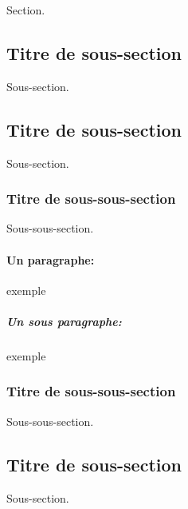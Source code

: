     Section.
        
    \subsection{Titre de sous-section}
    
    Sous-section.
    
    \subsection{Titre de sous-section}
    
    Sous-section.
    
    \subsubsection{Titre de sous-sous-section}
    
    Sous-sous-section.
    
    \paragraph{Un paragraphe:} exemple
    
    \subparagraph{Un sous paragraphe:} exemple
    
    \subsubsection{Titre de sous-sous-section}

    Sous-sous-section.
    
    \subsection{Titre de sous-section}
    
    Sous-section.
